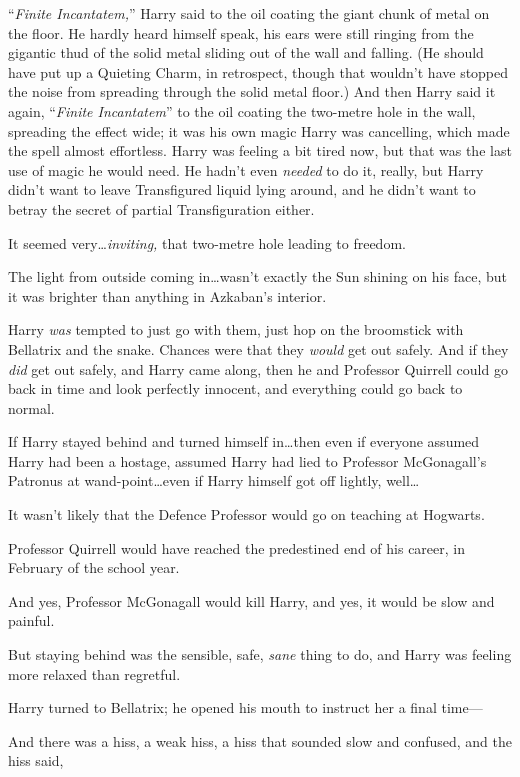 \later

“\emph{Finite Incantatem,}” Harry said to the oil coating the giant chunk of metal on the floor. He hardly heard himself speak, his ears were still ringing from the gigantic thud of the solid metal sliding out of the wall and falling. (He should have put up a Quieting Charm, in retrospect, though that wouldn’t have stopped the noise from spreading through the solid metal floor.) And then Harry said it again, “\emph{Finite Incantatem}” to the oil coating the two-metre hole in the wall, spreading the effect wide; it was his own magic Harry was cancelling, which made the spell almost effortless. Harry was feeling a bit tired now, but that was the last use of magic he would need. He hadn’t even \emph{needed} to do it, really, but Harry didn’t want to leave Transfigured liquid lying around, and he didn’t want to betray the secret of partial Transfiguration either.

It seemed very…\emph{inviting,} that two-metre hole leading to freedom.

The light from outside coming in…wasn’t exactly the Sun shining on his face, but it was brighter than anything in Azkaban’s interior.

Harry \emph{was} tempted to just go with them, just hop on the broomstick with Bellatrix and the snake. Chances were that they \emph{would} get out safely. And if they \emph{did} get out safely, and Harry came along, then he and Professor Quirrell could go back in time and look perfectly innocent, and everything could go back to normal.

If Harry stayed behind and turned himself in…then even if everyone assumed Harry had been a hostage, assumed Harry had lied to Professor McGonagall’s Patronus at wand-point…even if Harry himself got off lightly, well…

It wasn’t likely that the Defence Professor would go on teaching at Hogwarts.

Professor Quirrell would have reached the predestined end of his career, in February of the school year.

And yes, Professor McGonagall would kill Harry, and yes, it would be slow and painful.

But staying behind was the sensible, safe, \emph{sane} thing to do, and Harry was feeling more relaxed than regretful.

Harry turned to Bellatrix; he opened his mouth to instruct her a final time—

And there was a hiss, a weak hiss, a hiss that sounded slow and confused, and the hiss said,

